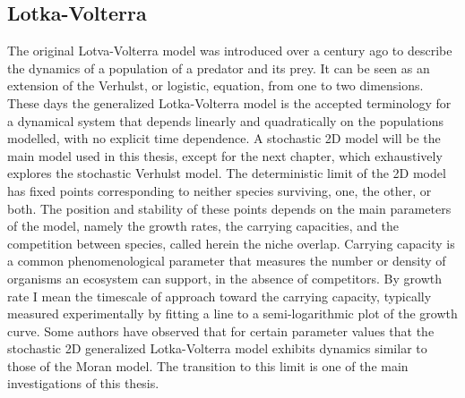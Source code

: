 \documentclass[a4paper,11pt]{article}
\numberwithin{equation}{section} %
\begin{document}
\subsection{Lotka-Volterra}
The original Lotva-Volterra model was introduced over a century ago to describe the dynamics of a population of a predator and its prey. 
It can be seen as an extension of the Verhulst, or logistic, equation, from one to two dimensions. 
These days the generalized Lotka-Volterra model is the accepted terminology for a dynamical system that depends linearly and quadratically on the populations modelled, with no explicit time dependence. 
A stochastic 2D model will be the main model used in this thesis, except for the next chapter, which exhaustively explores the stochastic Verhulst model. 
The deterministic limit of the 2D model has fixed points corresponding to neither species surviving, one, the other, or both. 
The position and stability of these points depends on the main parameters of the model, namely the growth rates, the carrying capacities, and the competition between species, called herein the niche overlap. 
Carrying capacity is a common phenomenological parameter that measures the number or density of organisms an ecosystem can support, in the absence of competitors. 
By growth rate I mean the timescale of approach toward the carrying capacity, typically measured experimentally by fitting a line to a semi-logarithmic plot of the growth curve. 
Some authors \cite{Lin2012,Constable2015,Chotibut2015} have observed that for certain parameter values that the stochastic 2D generalized Lotka-Volterra model exhibits dynamics similar to those of the Moran model. The transition to this limit is one of the main investigations of this thesis. 
\end{document}
